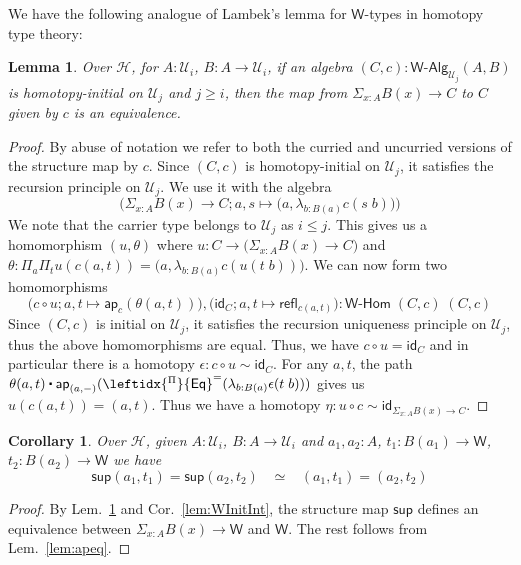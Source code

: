 \documentclass[reqno,10pt,a4paper,oneside]{amsart}
\newcommand{\comp}{\circ}
\newcommand{\idfun}[1]{\mathsf{id}_{#1}}
\newcommand{\prd}[1]{\Pi_{#1}}
\newcommand{\sm}[1]{\Sigma_{#1}}
\newcommand{\lam}[1]{\lambda_{#1}}
\newcommand{\refl}{\mathsf{refl}}
\newcommand{\W}{\mathsf{W}}
\newcommand{\wsup}{\mathsf{sup}}
\newcommand{\funext}{\leftidx{^\Pi}{\mathsf{Eq}}^{=}}
\newcommand{\UU}{\mathcal{U}}
\newcommand{\WAlg}{\mathsf{W}\text{-}\mathsf{Alg}}
\newcommand{\WHom}{\mathsf{W}\text{-}\mathsf{Hom}}
\newcommand{\app}{\mathsf{ap}}
\newcommand{\Hint}{\mathcal{H}}
\newcommand{\ct}{%
  \mathchoice{\mathbin{\raisebox{0.5ex}{$\displaystyle\centerdot$}}}%
             {\mathbin{\raisebox{0.5ex}{$\centerdot$}}}%
             {\mathbin{\raisebox{0.25ex}{$\scriptstyle\,\centerdot\,$}}}%
             {\mathbin{\raisebox{0.1ex}{$\scriptscriptstyle\,\centerdot\,$}}}}
\numberwithin{equation}{section}
\theoremstyle{mythm}
\newtheorem{lemma}[theorem]{Lemma}
\newtheorem{corollary}[theorem]{Corollary}
\theoremstyle{mydef}
\theoremstyle{myrmk}
\begin{document}
We have the following analogue of Lambek's lemma for $\W$-types in homotopy type theory:
\begin{lemma}\label{lem:IntLambek}
Over $\Hint$, for $A:\UU_i$, $B : A \to \UU_i$, if an algebra $(C,c) : \WAlg_{\UU_j}(A,B)$ is homotopy-initial on $\UU_j$ and $j \geq i$, then the map from $\sm{x:A} B(x) \to C$ to $C$ given by $c$ is an equivalence.
\end{lemma}
\begin{proof}
By abuse of notation we refer to both the curried and uncurried versions of the structure map by $c$. Since $(C,c)$ is homotopy-initial on $\UU_j$, it satisfies the recursion principle on $\UU_j$. We use it with the algebra \[\Big(\sm{x:A} B(x) \to C; a,s \mapsto \big(a,\lam{b:B(a)} c(s\;b)\big)\Big)\]
We note that the carrier type belongs to $\UU_j$ as $i \leq j$. This gives us a homomorphism $(u,\theta)$ where $u : C \to \big(\sm{x:A} B(x) \to C\big)$ and $\theta : \prd{a}\prd{t} u(c(a,t)) = \big(a,\lam{b:B(a)} c(u(t\;b))\big)$.  We can now form two homomorphisms
\[\big(c \comp u; a,t \mapsto \app_c(\theta(a,t))\big), \big(\idfun{C}; a,t \mapsto \refl_{c(a,t)}\big) : \WHom \; (C,c) \; (C,c)\]
Since $(C,c)$ is initial on $\UU_j$, it satisfies the recursion uniqueness principle on $\UU_j$, thus the above homomorphisms are equal. Thus, we have $c \comp u = \idfun{C}$ and in particular there is a homotopy $\epsilon : c \comp u \sim \idfun{C}$. For any $a,t$, the path $\theta(a,t) \ct \app_{(a,-)}(\funext(\lam{b:B(a)} \epsilon(t\;b)))$ gives us $u(c(a,t)) = (a,t)$. Thus we have a homotopy $\eta : u \comp c \sim \idfun{\sm{x:A} B(x) \to C}$.
\end{proof}

\begin{corollary}\label{lem:suppath}
Over $\Hint$, given $A:\UU_i$, $B : A \to \UU_i$ and $a_1,a_2:A$, $t_1 : B(a_1) \to \W$, $t_2 : B(a_2) \to \W$ we have
\[ \wsup(a_1,t_1) = \wsup(a_2,t_2) \;\;\; \simeq \;\;\; (a_1,t_1) = (a_2,t_2)\]
\end{corollary}
\begin{proof}
By Lem.~\ref{lem:IntLambek} and Cor.~\ref{lem:WInitInt}, the structure map $\wsup$ defines an equivalence between $\sm{x:A} B(x) \to \W$ and $\W$. The rest follows from Lem.~\ref{lem:apeq}.
\end{proof}
\end{document}
